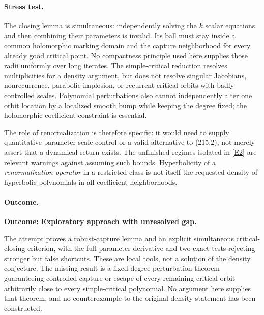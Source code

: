 \documentclass[11pt,a4paper]{article}
\newcommand{\eref}[2]{\hyperlink{extra:#1:#2}{[E#2]}}
\begin{document}
\paragraph{Stress test.}
The closing lemma is simultaneous: independently solving the $k$ scalar
equations and then combining their parameters is invalid. Its ball must
stay inside a common holomorphic marking domain and the capture
neighborhood for every already good critical point. No compactness
principle used here supplies those radii uniformly over long iterates.
The simple-critical reduction resolves multiplicities for a density
argument, but does not resolve singular Jacobians, nonrecurrence,
parabolic implosion, or recurrent critical orbits with badly controlled
scales. Polynomial perturbations also cannot independently alter one
orbit location by a localized smooth bump while keeping the degree fixed;
the holomorphic coefficient constraint is essential.

The role of renormalization is therefore specific: it would need to
supply quantitative parameter-scale control or a valid alternative to
(215.2), not merely assert that a dynamical return exists. The unfinished
regimes isolated in \eref{statement}{2} are relevant warnings against assuming
such bounds. Hyperbolicity of a \emph{renormalization operator} in a
restricted class is not itself the requested density of hyperbolic
polynomials in all coefficient neighborhoods.

\paragraph{Outcome.}
\textbf{Outcome: Exploratory approach with unresolved gap.}

The attempt proves a robust-capture lemma and an explicit simultaneous
critical-closing criterion, with the full parameter derivative and two
exact tests rejecting stronger but false shortcuts. These are local tools,
not a solution of the density conjecture. The missing result is a
fixed-degree perturbation theorem guaranteeing controlled capture or
escape of every remaining critical orbit arbitrarily close to every
simple-critical polynomial. No argument here supplies that theorem, and
no counterexample to the original density statement has been constructed.
\end{document}
